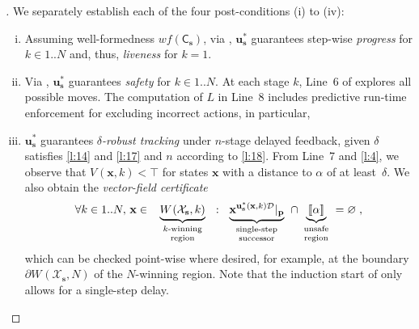 \documentclass{article}
\newcommand\mkYcAoM[1][]{\mathcal{D}_{#1}}
\newcommand\mcrHMQW[1]{[\![#1]\!]}
\newcommand\mijCQyI[1][]{V^{#1}}
\renewcommand\vec[1]{\mathbf{#1}}
\newcommand\mDpbDSN[1][]{W^{#1}}
\begin{document}
{\begin{proof}[]
  We separately establish each of the four post-conditions (i) to (iv):
  \begin{enumerate}[(i)]
  \item Assuming well-formedness $\mathit{wf}(\mathsf{C}_{\vec{s}})$, via
    , ${\vec{u}}^*_{\vec{s}}$ guarantees
    step-wise \emph{progress} for $k\in1..N$ and,
    thus, \emph{liveness} for
    $k=1$. 
    \hfill\resizebox{.5em}{.6em}{/\kern-.5em$\Box$}
    
  \item Via , ${\vec{u}}^*_{\vec{s}}$
    guarantees \emph{safety} for $k\in1..N$.  At each
    stage $k$, Line~6 of 
    explores all possible moves.  The computation of $L$ in
    Line~8 includes predictive run-time
    enforcement for excluding incorrect actions, in particular,
    \hfill\resizebox{.5em}{.6em}{/\kern-.5em$\Box$}

  \item ${\vec{u}}^*_{\vec{s}}$ guarantees \emph{$\delta$-robust tracking}
    under $n$-stage delayed 
    feedback,
    given $\delta$ satisfies \eqref{l:14} and
    \eqref{l:17} and $n$ according to
    \eqref{l:18}.  From Line~7
    and \eqref{l:4}, we observe that
    $\mijCQyI({\vec{x}},k) < \top$ for states ${\vec{x}}$
    with a distance to $\alpha$ of at least~$\delta$.
    We also obtain the \emph{vector-field certificate}
    \[
      \forall k\in1..N,\,{\vec{x}}\in
      \underbrace{
        \mDpbDSN(\mathcal{X}_{\vec{s}},k)
      }_{\parbox{2cm}{\scriptsize\centering
          $k$-winning\\region}} 
      \colon
      \underbrace{
        {\vec{x}}^{{{\vec{u}}^*_{\vec{s}}({\vec{x}},k)}\mkYcAoM}|_{\vec{p}}
      }_{\parbox{2cm}{\scriptsize\centering single-step\\successor}} 
      \cap
      \underbrace{
        \mcrHMQW\alpha%
      }_{\parbox{1cm}{\scriptsize\centering
          unsafe\\region}}%
      =\varnothing\;,
    \]
    which can be checked point-wise where desired, for example, at the
    boundary
    $\partial\mDpbDSN(\mathcal{X}_{\vec{s}},N)$
    of the $N$-winning region.
    Note that the induction start of
     only allows for a
    single-step delay.
    \hfill\resizebox{.5em}{.6em}{/\kern-.5em$\Box$}
  

\end{enumerate}
\end{proof}}
\end{document}

